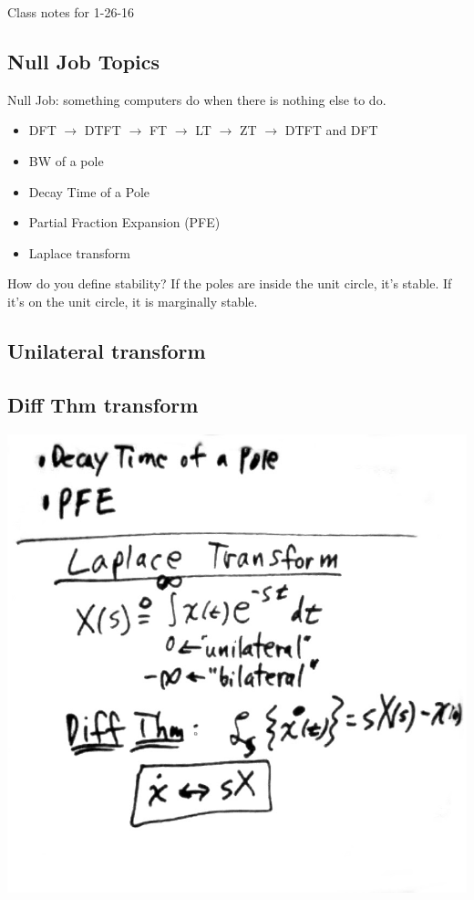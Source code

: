 Class notes for 1-26-16

\subsection*{Null Job Topics}
Null Job: something computers do when there is nothing else to do. 
\begin{itemize}
\item{DFT $\rightarrow$ DTFT $\rightarrow$ FT $\rightarrow$ LT $\rightarrow$ ZT 
$\rightarrow$ DTFT and DFT}
\item{BW of a pole}
\item{Decay Time of a Pole}
\item{Partial Fraction Expansion (PFE)}
\item{Laplace transform}
\end{itemize}

How do you define stability? If the poles are inside the unit circle, it's
stable.
If it's on the unit circle, it is marginally stable. 

\subsection*{Unilateral transform}

\subsection*{Diff Thm transform}

\includegraphics[scale=0.3]{photos/jan26/11a}

